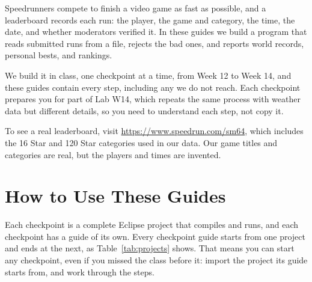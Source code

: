 \documentclass[11pt]{article}
\begin{document}
\sloppy


\noindent
Speedrunners compete to finish a video game as fast as possible, and a leaderboard records each
run: the player, the game and category, the time, the date, and whether moderators verified it. In
these guides we build a program that reads submitted runs from a file, rejects the bad ones, and
reports world records, personal bests, and rankings.

We build it in class, one checkpoint at a time, from Week 12 to Week 14, and these guides contain
every step, including any we do not reach. Each checkpoint prepares you for part of Lab W14, which
repeats the same process with weather data but different details, so you need to understand each
step, not copy it.

To see a real leaderboard, visit \url{https://www.speedrun.com/sm64}, which includes the 16 Star
and 120 Star categories used in our data. Our game titles and categories are real, but the players
and times are invented.


\section{How to Use These Guides}

Each checkpoint is a complete Eclipse project that compiles and runs, and each checkpoint has a
guide of its own. Every checkpoint guide starts from one project and ends at the next, as
Table~\ref{tab:projects} shows. That means you can start any checkpoint, even if you missed the
class before it: import the project its guide starts from, and work through the steps.
\end{document}

